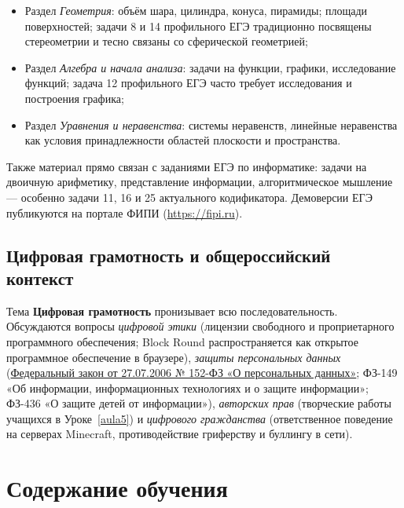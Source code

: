 \documentclass[12pt,a4paper]{scrartcl}
\newcommand{\acc}[1]{\textcolor{accent}{\textbf{#1}}}
\begin{document}
\begin{itemize}[leftmargin=1.3em,itemsep=0.15em,topsep=0.3em]
  \item Раздел \emph{Геометрия}: объём шара, цилиндра, конуса, пирамиды; площади поверхностей; задачи 8 и 14 профильного ЕГЭ традиционно посвящены стереометрии и тесно связаны со сферической геометрией;
  \item Раздел \emph{Алгебра и начала анализа}: задачи на функции, графики, исследование функций; задача 12 профильного ЕГЭ часто требует исследования и построения графика;
  \item Раздел \emph{Уравнения и неравенства}: системы неравенств, линейные неравенства как условия принадлежности областей плоскости и пространства.
\end{itemize}

Также материал прямо связан с заданиями ЕГЭ по информатике: задачи на двоичную арифметику, представление информации, алгоритмическое мышление --- особенно задачи 11, 16 и 25 актуального кодификатора. Демоверсии ЕГЭ публикуются на портале ФИПИ (\url{https://fipi.ru}).

\subsection{Цифровая грамотность и общероссийский контекст}

Тема \acc{Цифровая грамотность} пронизывает всю последовательность. Обсуждаются вопросы \emph{цифровой этики} (лицензии свободного и проприетарного программного обеспечения; Block Round распространяется как открытое программное обеспечение в браузере), \emph{защиты персональных данных} (\href{http://www.consultant.ru/document/cons_doc_LAW_61801/}{Федеральный закон от 27.07.2006 № 152-ФЗ «О персональных данных»}; ФЗ-149 «Об информации, информационных технологиях и о защите информации»; ФЗ-436 «О защите детей от информации»), \emph{авторских прав} (творческие работы учащихся в Уроке~\ref{aula5}) и \emph{цифрового гражданства} (ответственное поведение на серверах Minecraft, противодействие гриферству и буллингу в сети).

\section{Содержание обучения}\label{sec:conteudos}
\end{document}
